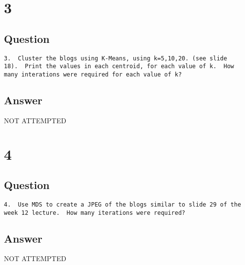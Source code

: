 \documentclass[letterpaper,11pt]{article}
\begin{document}
\section*{3}

\subsection*{Question}

\begin{verbatim}
3.  Cluster the blogs using K-Means, using k=5,10,20. (see slide
18).  Print the values in each centroid, for each value of k.  How
many interations were required for each value of k?
\end{verbatim}

\subsection*{Answer}

\begin{center}
\Huge{NOT ATTEMPTED}
\end{center}




\section*{4}

\subsection*{Question}

\begin{verbatim}
4.  Use MDS to create a JPEG of the blogs similar to slide 29 of the 
week 12 lecture.  How many iterations were required?
\end{verbatim}

\subsection*{Answer}

\begin{center}
\Huge{NOT ATTEMPTED}
\end{center}
\end{document}
